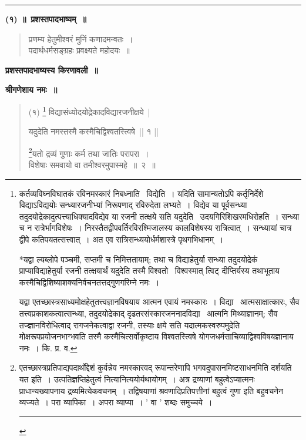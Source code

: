 \documentclass[11pt, openany]{book}
\begin{document}
\vspace{-7mm}
\begin{center}
\rule{0.2\linewidth}{0.5pt}
\end{center}

\newpage
\thispagestyle{empty}
\begin{center}
\textbf{(१) ॥~प्रशस्तपादभाष्यम्~॥}
\end{center}
\begin{quote}
{\qt प्रणम्य हेतुमीश्वरं मुनिं कणादमन्वतः~।\\
पदार्थधर्मसङ्ग्रहः प्रवक्ष्यते महोदयः~॥}
\end{quote}
\begin{center}
\textbf{\LARGE प्रशस्तपादभाष्यस्य किरणावली~॥}

\textbf{\small श्रीगणेशाय नमः~॥}
\end{center}

\begin{quote}
{\knu (१) \renewcommand{\thefootnote}{१}\footnote{कर्तव्यविघ्नविघातकं रविनमस्कारं निबध्नाति \textendash\ विद्येति~। यदिति सामान्यतोऽपि कर्तृनिर्देशे विद्याऽविद्ययोः सन्ध्यारजनीभ्यां निरूपणाद् रविरुदेता लभ्यते~। विद्येव या पूर्वसन्ध्या तदुदयोद्रेकादुत्पत्त्याधिक्यादविद्येव या रजनी तत्क्षये सति यदुदेति \textendash\ उदयगिरिशिखरमधिरोहति~। सन्ध्या च न रात्रेर्भागविशेषः~। निरस्तैतद्वीपवर्तिरविरश्मिजालस्य कालविशेषस्य रात्रित्वात्~। सन्ध्यायां चात्र द्वीपे कतिपयतत्सत्त्वात्~। अत एव रात्रिसन्ध्ययोर्धर्मशास्त्रे पृथगभिधानम्~।

*यद्वा ल्यब्लोपे पञ्चमी, सप्तमी च निमित्ततायाम्; तथा च विद्याहेतुर्या सन्ध्या तदुदयोद्रेकं प्राप्याविद्याहेतुर्या रजनी तत्क्षयार्थं यदुदेति तस्मै विश्वतो \textendash\ विश्वस्मात् त्विट् दीप्तिर्यस्य तथाभूताय कस्मैचिद्विशिष्याशक्यनिर्वचनतत्तद्गुणगरिम्ने नमः~।

यद्वा एतच्छास्त्रसाध्यमोक्षहेतुतत्त्वज्ञानविषयाय आत्मन एवायं नमस्कारः~। विद्या \textendash\ आत्मसाक्षात्कारः, सैव तत्त्वप्रकाशकत्वात्सन्ध्या, तदुदयोद्रेकाद् दृढतरसंस्कारजननादविद्या \textendash\ आत्मनि मिथ्याज्ञानम्; सैव तज्ज्ञानविरोधित्वाद् रागजनेकत्वाद्वा रजनी, तस्याः क्षये सति यदात्मकस्वरुपमुदेति मोक्षरूपप्रयोजनभाग्भवति तस्मै कस्मैचित्सर्वोकृष्टाय विश्वतस्त्विषे योगजधर्मसाचिव्याद्विश्वविषयज्ञानाय नमः~। कि. प्र. व.}
विद्यासंध्योदयोद्रेकादविद्यारजनीक्षये~|

     यदुदेति नमस्तस्मै कस्मैचिद्विश्वतस्त्विषे~|| १ ||
     
\renewcommand{\thefootnote}{२}\footnote{एतच्छास्त्रप्रतिपाद्यपदार्थोद्देशं कुर्वन्नेव नमस्कारवद् रूपान्तरेणापि भगवदुपासनमिष्टसाधनमिति दर्शयति यत इति~। उत्पतिज्ञप्तिहेतुत्वं नित्यानित्ययोर्यथायोगम्~। अत्र द्रव्याणां बहुत्वेऽप्यात्मनः प्राधान्यख्यापनाय द्रव्यमित्येकवचनम्~। तद्विषयाणां श्रवणादिप्रतिपत्तीनां बहुत्वं गुणा इति बहुवचनेन व्यज्यते~। परा व्यापिका~। अपरा व्याप्या~। ' वा ' शब्दः समुच्चये~। \rule{0.4\linewidth}{0.5pt}}यतो द्रव्यं गुणाः कर्म तथा जातिः परापरा~।\\
विशेषाः समवायो वा तमीश्वरमुपास्महे~॥~२~॥}
\end{quote}
\end{document}
